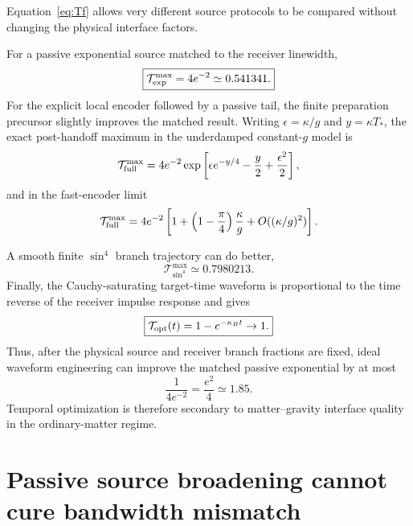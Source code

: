 \documentclass[11pt]{article}
\begin{document}
Equation~\eqref{eq:Tf} allows very different source protocols to be compared without changing the physical interface factors.

For a passive exponential source matched to the receiver linewidth,
\begin{equation}
\boxed{
\mathcal T_{\rm exp}^{\max}=4e^{-2}\simeq0.541341.
}
\end{equation}
For the explicit local encoder followed by a passive tail, the finite preparation precursor slightly improves the matched result. Writing $\epsilon=\kappa/g$ and $y=\kappa T_*$, the exact post-handoff maximum in the underdamped constant-$g$ model is
\begin{equation}
\mathcal T_{\rm full}^{\max}
=4e^{-2}
\exp\left[
\epsilon e^{-y/4}
-\frac y2
+\frac{\epsilon^2}{2}
\right],
\end{equation}
and in the fast-encoder limit
\begin{equation}
\mathcal T_{\rm full}^{\max}
=4e^{-2}
\left[
1+\left(1-\frac\pi4\right)\frac\kappa g
+O((\kappa/g)^2)
\right].
\end{equation}

A smooth finite $\sin^4$ branch trajectory can do better,
\begin{equation}
\boxed{
\mathcal T_{\sin^4}^{\max}\simeq0.7980213.
}
\end{equation}
Finally, the Cauchy-saturating target-time waveform is proportional to the time reverse of the receiver impulse response and gives
\begin{equation}
\boxed{
\mathcal T_{\rm opt}(t)=1-e^{-\kappa_Bt}\to1.
}
\end{equation}
Thus, after the physical source and receiver branch fractions are fixed, ideal waveform engineering can improve the matched passive exponential by at most
\begin{equation}
\frac{1}{4e^{-2}}=\frac{e^2}{4}\simeq1.85.
\end{equation}
Temporal optimization is therefore secondary to matter--gravity interface quality in the ordinary-matter regime.

\section{Passive source broadening cannot cure bandwidth mismatch}
\label{sec:passive-nogo}
\end{document}
